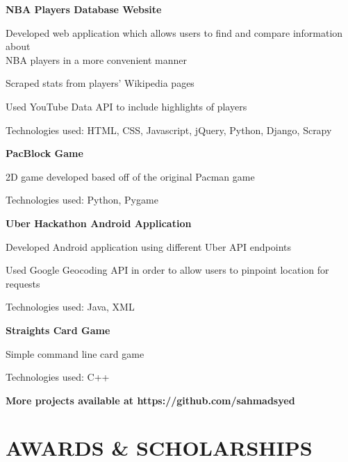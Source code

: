 \documentclass[margin,line]{resume}
\begin{document}
\begin{resume}
    \textbf{\listing NBA Players Database Website}\vspace{2mm}
    \begin{list2}
        \item Developed web application which allows users to find and compare information about \\NBA players in a more convenient manner
        \item Scraped stats from players' Wikipedia pages
        \item Used YouTube Data API to include highlights of players
        \item Technologies used: HTML, CSS, Javascript, jQuery, Python, Django, Scrapy
    \end{list2}
    \vspace{-0.5mm}
    \textbf{\listing PacBlock Game}\vspace{2mm}
    \begin{list2}
        \item 2D game developed based off of the original Pacman game
        \item Technologies used: Python, Pygame
    \end{list2}
    \vspace{-0.5mm}
    \textbf{\listing Uber Hackathon Android Application}\vspace{2mm}
    \begin{list2}
        \item Developed Android application using different Uber API endpoints
        \item Used Google Geocoding API in order to allow users to pinpoint location for requests
        \item Technologies used: Java, XML
    \end{list2}
    \vspace{-0.5mm}
    \textbf{\listing Straights Card Game}\vspace{2mm}
    \begin{list2}
        \item Simple command line card game
        \item Technologies used: C++
    \end{list2}
    \textbf{More projects available at https://github.com/sahmadsyed}
\sectionline\vspace{1mm}

    \section{\mysidestyle \textbf{\large{A}\small{WARDS \& SCHOLARSHIPS}}}
    

\end{resume}
\end{document}
